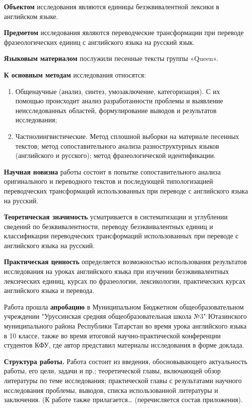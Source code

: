 \par \textbf{Объектом} исследования являются единицы безэквивалентной лексики в английском  языке.
\par \textbf{Предметом} исследования являются переводческие трансформации при переводе фразеологических единиц с английского языка на русский язык.  
\par \textbf{Языковым материалом} послужили песенные тексты группы «Queen».
\par \textbf{К основным методам} исследования относятся:
\begin{enumerate}[label=\arabic*)] 
    \item Общенаучные (анализ, синтез, умозаключение, категоризация). С их помощью происходит анализ разработанности проблемы и выявление неисследованных областей, формулирование выводов и результатов исследования;
    \item Частнолингвистические. Метод сплошной выборки на материале песенных текстов; метод сопоставительного анализа разноструктурных языков (английского и русского); метод фразеологической идентификации.
\end{enumerate}
\par \textbf{Научная новизна} работы состоит в попытке сопоставительного анализа оригинального и переводного текстов и последующей типологизацией переводческих трансформаций  использованных при переводе  с английского языка на русский.
\par \textbf{Теоретическая значимость} усматривается в систематизации и углублении сведений по безквивалентности, переводу безэквивалентных единиц и классификации переводческих трансформаций использованных при переводе с английского языка на русский.
\par \textbf{Практическая ценность} определяется возможностью использования результатов исследования на уроках английского языка при изучении безэквивалентных лексических единиц, курсах по фразеологии, лексикологии, практических курсах английского языка и перевода.
\par Работа прошла \textbf{апробацию} в Муниципальном Бюджетном общеобразовательном  учреждении "Уруссинская средняя общеобразовательная школа №3" Ютазинского муниципального  района Республики Татарстан во время урока английского языка в 10 классе, также во время  итоговой научно-практической конференции студентов КФУ, где автор представил материалы исследования в форме доклада.
\par \textbf{Структура работы.} Работа состоит из введения, обосновывающего актуальность работы, его цели, задачи и пр.; теоретической главы, включающей обзор литературы по теме исследования; практической главы с результатами научного исследования проблемы, выводов, списка использованной литературы и заключения. (К работе также прилагается… (перечисляется состав приложения).  



\clearpage
